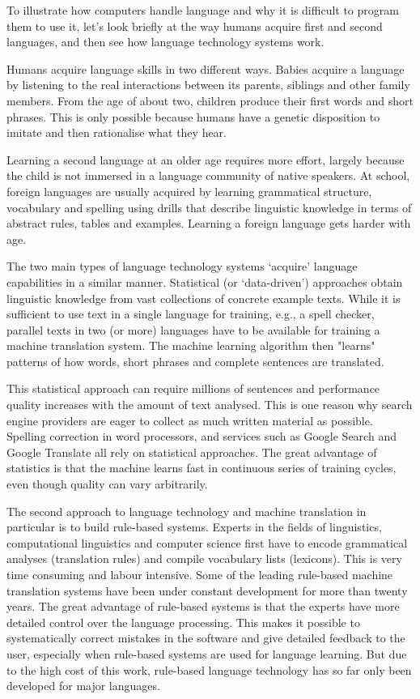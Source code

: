 \begin{multicols}{2}
To illustrate how computers handle language and why it is difficult to program them to use it, let’s look briefly at the way humans acquire first and second languages, and then see how language technology systems work. 

Humans acquire language skills in two different ways. Babies acquire a language by listening to the real interactions between its parents, siblings and other family members. From the age of about two, children produce their first words and short phrases. This is only possible because humans have a genetic disposition to imitate and then rationalise what they hear. 

Learning a second language at an older age requires more effort, largely because the child is not immersed in a language community of native speakers. At school, foreign languages are usually acquired by learning grammatical structure, vocabulary and spelling using drills that describe linguistic knowledge in terms of abstract rules, tables and examples. Learning a foreign language gets harder with age.

The two main types of language technology systems ‘acquire’ language capabilities in a similar manner. Statistical (or ‘data-driven’) approaches obtain linguistic knowledge from vast collections of concrete example texts. While it is sufficient to use text in a single language for training, e.g., a spell checker, parallel texts in two (or more) languages have to be available for training a machine translation system. The machine learning algorithm then "learns" patterns of how words, short phrases and complete sentences are translated. 

This statistical approach can require millions of sentences and performance quality increases with the amount of text analysed. This is one reason why search engine providers are eager to collect as much written material as possible. Spelling correction in word processors, and services such as Google Search and Google Translate all rely on statistical approaches. The great advantage of statistics is that the machine learns fast in continuous series of training cycles, even though quality can vary arbitrarily.

The second approach to language technology and machine translation in particular is to build rule-based systems. Experts in the fields of linguistics, computational linguistics and computer science first have to encode grammatical analyses (translation rules) and compile vocabulary lists (lexicons). This is very time consuming and labour intensive. Some of the leading rule-based machine translation systems have been under constant development for more than twenty years. The great advantage of rule-based systems is that the experts have more detailed control over the language processing. This makes it possible to systematically correct mistakes in the software and give detailed feedback to the user, especially when rule-based systems are used for language learning. But due to the high cost of this work, rule-based language technology has so far only been developed for major languages. 


\end{multicols}
